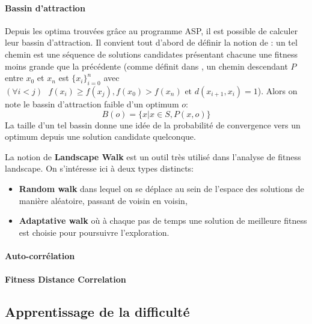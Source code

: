 \documentclass[../main.tex]{subfiles}
\begin{document}
	\paragraph{Bassin d'attraction}{Depuis les optima trouvées grâce au programme ASP, il est possible de calculer leur bassin d'attraction. Il convient tout d'abord de définir la notion de : un tel chemin est une séquence de solutions candidates présentant chacune une fitness moins grande que la précédente (comme définit dans \cite{?}, un chemin descendant $P$ entre $x_0$ et $x_n$ est $\{x_i\}_{i=0}^n$ avec $(\forall i < j)\text{ }f(x_i) \geq f(x_j), f(x_0) > f(x_n) \text{ et } d(x_{i+1}, x_i) = 1$). Alors on note le bassin d'attraction faible d'un optimum $o$:
	\begin{equation*}
	    B(o) = \{x | x \in S, P(x, o)\}
	\end{equation*}
La taille d'un tel bassin donne une idée de la probabilité de convergence vers un optimum depuis une solution candidate quelconque.
	}
	\begin{definition}
	\label{def-walk}
	La notion de \textbf{Landscape Walk} \cite{?} est un outil très utilisé dans l'analyse de fitness landscape. On s'intéresse ici à deux types distincts: 
	\begin{itemize}
	    \item \textbf{Random walk} dans lequel on se déplace au sein de l'espace des solutions de manière aléatoire, passant de voisin en voisin,
	    \item \textbf{Adaptative walk} où à chaque pas de temps une solution de meilleure fitness est choisie pour poursuivre l'exploration.
	\end{itemize}
	
	\end{definition}
	\paragraph{Auto-corrélation}{
	
	}
	\paragraph{Fitness Distance Correlation}
	\subsection{Apprentissage de la difficulté}
	
\end{document}
